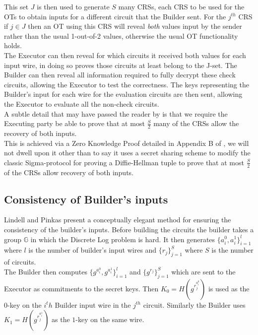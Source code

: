 \documentclass[ %
                    author={Nicholas Tutte},
                supervisor={Prof. Nigel Smart},
                    degree={MEng},
                     title={Secure Two Party Computation},
                  subtitle={A practical comparison of recent protocols},
                      type={Research - GG1K},
                      year={2015} ]{dissertation}
\begin{document}
				This set $J$ is then used to generate $S$ many CRSs, each CRS to be used for the OTs to obtain inputs for a different circuit that the Builder sent. For the $j^{th}$ CRS if $j \in J$ then an OT using this CRS will reveal \emph{both} values input by the sender rather than the usual 1-out-of-2 values, otherwise the usual OT functionality holds.\\

				The Executor can then reveal for which circuits it received both values for each input wire, in doing so proves those circuits at least belong to the J-set. The Builder can then reveal all information required to fully decrypt these check circuits, allowing the Executor to test the correctness. The keys representing the Builder's input for each wire for the evaluation circuits are then sent, allowing the Executor to evaluate all the non-check circuits.\\

				A subtle detail that may have passed the reader by is that we require the Executing party be able to prove that at most $\frac{S}{2}$ many of the CRSs allow the recovery of both inputs.\\ 

				This is achieved via a Zero Knowledge Proof detailed in Appendix B of \cite{LindellAndPinkas2011}, we will not dwell upon it other than to say it uses a secret sharing scheme to modify the classic Sigma-protocol for proving a Diffie-Hellman tuple to prove that at most $\frac{S}{2}$ of the CRSs allow recovery of both inputs.

			\subsection{Consistency of Builder's inputs}
				Lindell and Pinkas present a conceptually elegant method for ensuring the consistency of the builder's inputs. Before building the circuits the builder takes a group $\mathbb{G}$ in which the Discrete Log problem is hard. It then generates $\{a_i^0, a_i^1\}_{i = 1}^{l}$ where $l$ is the number of builder's input wires and $\{r_j\}_{j = 1}^{S}$ where $S$ is the number of circuits.\\

				The Builder then computes $\{g^{a_i^0}, g^{a_i^1}\}_{i = 1}^{l}$ and $\{g^{r_j}\}_{j = 1}^{S}$ which are sent to the Executor as commitments to the secret keys. Then $K_0 = H(g^{r_j^{a_i^0}})$ is used as the $0$-key on the $i^th$ Builder input wire in the $j^{th}$ circuit. Similarly the Builder uses $K_1 = H(g^{r_j^{a_i^1}})$ as the $1$-key on the same wire.\\
\end{document}
